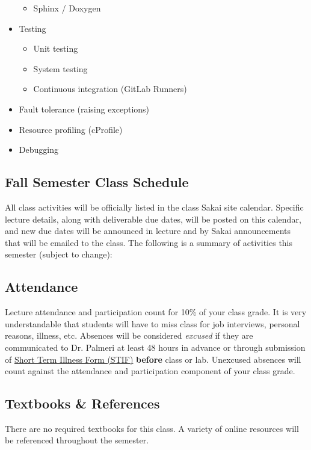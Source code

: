\begin{multicols}{2}
\begin{itemize}
\begin{itemize}
        \item Sphinx / Doxygen
    \end{itemize}
    \item Testing
    \begin{itemize}
        \item Unit testing
        \item System testing
        \item Continuous integration (GitLab Runners)
    \end{itemize}
    \item Fault tolerance (raising exceptions)
    \item Resource profiling (cProfile)
    \item Debugging
\end{itemize}
\end{multicols}

\subsection*{Fall Semester Class Schedule} 
All class activities will be officially listed in the class Sakai site
calendar.  Specific lecture details, along with deliverable due dates,
will be posted on this calendar, and new due dates will be announced in lecture
and by Sakai announcements that will be emailed to the class.  The following is
a summary of activities this semester (subject to change):



\subsection*{Attendance}
Lecture attendance and participation count for 10\% of
your class grade.  It is very understandable that students will have to miss
class for job interviews, personal reasons, illness, etc.  Absences will
be considered \emph{excused} if they are communicated to Dr. Palmeri at least
48 hours in advance or through submission of
\href{http://www.pratt.duke.edu/undergrad/policies/3531}{Short Term Illness
    Form (STIF)} {\bf before} class or lab.  Unexcused absences will count
against the attendance and participation component of your class grade.  

\subsection*{Textbooks \& References} 
There are no required textbooks for this class.  A variety of online resources will be referenced throughout the semester.

